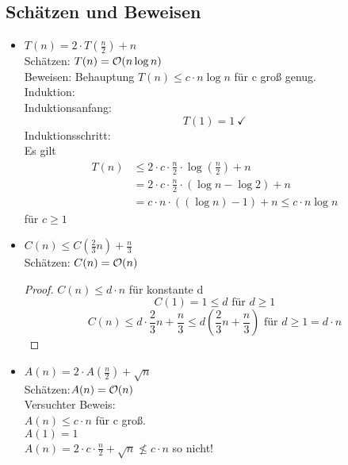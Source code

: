 \subsection{Schätzen und Beweisen}
\begin{itemize}
\item
$T(n) = 2 \cdot T\left( \frac{n}{2}\right) + n$ \\
Schätzen: $T(n) = \mathcal{O}(n \log n)$ \\
Beweisen: Behauptung $T(n) \leq c \cdot n \log n$ für c groß genug. \\ %
Induktion: \\
Induktionsanfang: 
$$
T(1) = 1\ \checkmark
$$ 
Induktionsschritt: \\
Es gilt 
$$\begin{aligned}
T(n) &\leq 2 \cdot c \cdot \frac{n}{2} \cdot \log \left(\frac{n}{2}\right) + n \\
&= 2 \cdot c \cdot \frac{n}{2} \cdot (\log n - \log 2) + n \\
&= c \cdot n \cdot ((\log n) -1) + n \leq c \cdot n \log n 
\end{aligned} $$
für $c \geq 1$
\item
$C(n) \leq C ( \frac{2}{3} n) + \frac{n}{3}$ \\
Schätzen: $C(n) = \mathcal{O}(n)$
\begin{proof}
$C(n) \leq d \cdot n$ für konstante d 
\[C(1) = 1 \leq d \text{ für }d \geq 1\]
$$C(n) \leq d \cdot \frac{2}{3} n + \frac{n}{3} \leq d(\frac{2}{3}n + \frac{n}{3})  \text{ für } d \geq 1 =d \cdot n$$ \end{proof}

\item
$A(n) = 2 \cdot A(\frac{n}{2}) + \sqrt{n}$ \\
Schätzen:$A(n) = \mathcal{O}(n)$ \\
Versuchter Beweis:\\
$A(n) \leq c \cdot n$ für c groß.\\
$A(1) = 1 $ \\
$A(n) = 2 \cdot c \cdot \frac{n}{2} + \sqrt{n} \nleq c \cdot n$ so nicht!
\end{itemize}  

